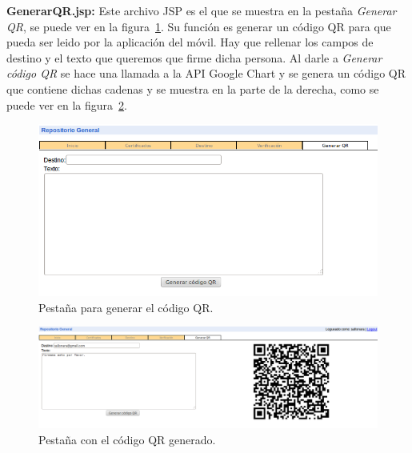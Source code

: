 \begin{description}
\item \textbf{GenerarQR.jsp:} Este archivo JSP es el que se muestra en la pestaña \textit{Generar QR}, se puede ver en la figura~\ref{fig:pestanhaQR}. Su función es generar un código QR para que pueda ser leido por la aplicación del móvil. Hay que rellenar los campos de destino y el texto que queremos que firme dicha persona. Al darle a \textit{Generar código QR} se hace una llamada a la API Google Chart y se genera un código QR que contiene dichas cadenas y se muestra en la parte de la derecha, como se puede ver en la figura~\ref{fig:codigoQR}.

\begin{figure}
  \centering
    \includegraphics[scale=0.5]{./GoogleAppEngine/imagenes/pestanhaQR.png}
  \caption{Pestaña para generar el código QR.}
  \label{fig:pestanhaQR}
\end{figure}

\begin{figure}
  \centering
    \includegraphics[scale=0.5]{./GoogleAppEngine/imagenes/codigoQR.png}
  \caption{Pestaña con el código QR generado.}
  \label{fig:codigoQR}
\end{figure}

\end{description}


